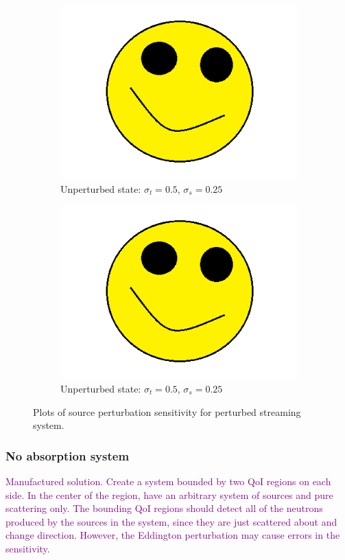 \documentclass[12pt]{report}
\newcommand{\sigt}{\sigma_t}
\newcommand{\sigs}{\sigma_s}
\newcommand{\comment}[2]{\marginpar{\textcolor{#2}{$\star$}}\textcolor{#2}{#1}\newline}
\newcommand{\todo}[1]{\comment{#1}{purple}}
\newcommand{\todo}[1]{\phantom{a}}
\begin{document}
\begin{figure}[H]
\begin{subfigure}{.5\textwidth}
  \includegraphics[width=.98\linewidth]{figures/holder.png}
  \caption{Unperturbed state: $\sigt=0.5$, $\sigs=0.25$}
  \label{fig:sfig3}
\end{subfigure}%
\begin{subfigure}{.5\textwidth}
  \centering
  \includegraphics[width=.98\linewidth]{figures/holder.png}
  \caption{Unperturbed state: $\sigt=0.5$, $\sigs=0.25$}
  \label{fig:sfig6}
\end{subfigure}%
\caption{Plots of source perturbation sensitivity for perturbed streaming system.}
\label{fig:fig}
\end{figure}


\subsubsection{No absorption system}
\todo{Manufactured solution. Create a system bounded by two QoI regions on each side. In the center of the region, have an arbitrary system of sources and pure scattering only. The bounding QoI regions should detect all of the neutrons produced by the sources in the system, since they are just scattered about and change direction. However, the Eddington perturbation may cause errors in the sensitivity.}
\end{document}
